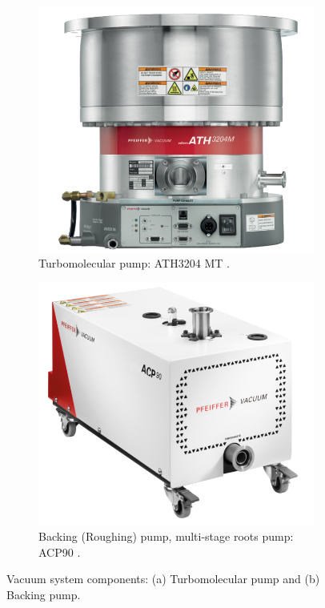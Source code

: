 \begin{figure}[H]
    \centering
    \begin{subfigure}[b]{0.45\textwidth}
        \centering
        \includegraphics[width=1\textwidth]{sections/imges/vacuum_vessel/ath3204.PNG}
        \caption{Turbomolecular pump: ATH3204 MT \cite{ATH3204}.}
        \label{fig:ATH}
    \end{subfigure}
    \hfill
    \begin{subfigure}[b]{0.45\textwidth}
        \centering
        \includegraphics[width=1\textwidth]{sections/imges/vacuum_vessel/acp.PNG}
        \caption{Backing (Roughing) pump, multi-stage roots pump: ACP90 \cite{ACP90}.}
        \label{fig:ACP}
    \end{subfigure}
    \caption{Vacuum system components: (a) Turbomolecular pump and (b) Backing pump.}
    \label{fig:vacuum_system}
\end{figure}


